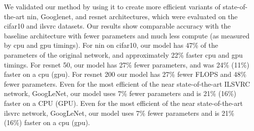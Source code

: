 \documentclass[thesis]{subfiles}
\begin{document}
	We validated our method by using it to create more efficient variants of state-of-the-art \gls{nin}, Googlenet, and \gls{resnet} architectures, which were evaluated on the \gls{cifar10} and \gls{ilsvrc} datasets. Our results show comparable accuracy with the baseline architecture with fewer parameters and much less compute (as measured by \gls{cpu} and \gls{gpu} timings). For \gls{nin} on \gls{cifar10}, our model has 47\% of the parameters of the original network, and approximately 22\% faster \gls{cpu} and \gls{gpu} timings. For \gls{resnet} 50, our model has 27\% fewer parameters, and was 24\% (11\%) faster on a \gls{cpu} (\gls{gpu}).  For \gls{resnet} 200 our model has 27\% fewer FLOPS and 48\% fewer parameters. Even for the most efficient of the near state-of-the-art ILSVRC network, GoogLeNet, our model uses 7\% fewer parameters and is 21\% (16\%) faster on a CPU (GPU). Even for the most efficient of the near state-of-the-art \gls{ilsvrc} network, GoogLeNet, our model uses 7\% fewer parameters and is 21\% (16\%) faster on a \gls{cpu} (\gls{gpu}).
\end{document}
